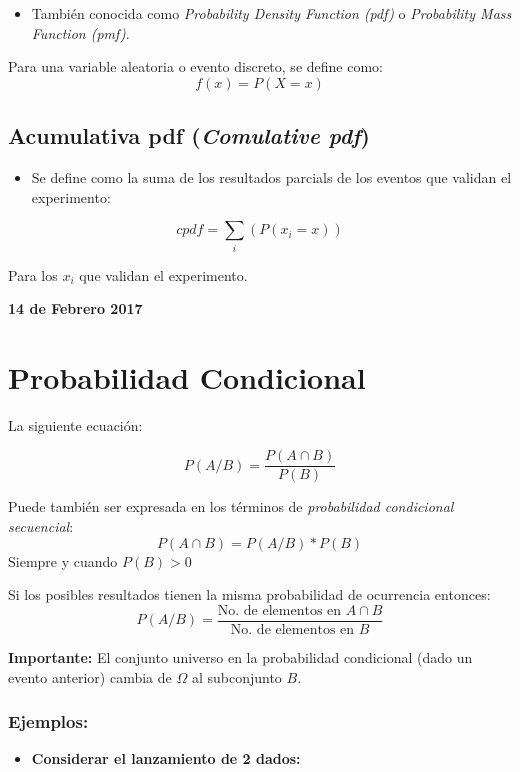 \documentclass[]{book}
\providecommand{\tightlist}{%
  \setlength{\itemsep}{0pt}\setlength{\parskip}{0pt}}
\begin{document}
\begin{itemize}
\tightlist
\item
  También conocida como \emph{Probability Density Function (pdf)} o
  \emph{Probability Mass Function (pmf)}.
\end{itemize}

Para una variable aleatoria o evento discreto, se define como:
\[f(x) = P(X=x)\]

\subsection{\texorpdfstring{Acumulativa pdf (\emph{Comulative
pdf})}{Acumulativa pdf (Comulative pdf)}}\label{acumulativa-pdf-comulative-pdf}

\begin{itemize}
\tightlist
\item
  Se define como la suma de los resultados parcials de los eventos que
  validan el experimento:
\end{itemize}

\[cpdf = \sum_{i}(P(x_i=x))\]

Para los \(x_i\) que validan el experimento.

\textbf{14 de Febrero 2017}

\section{Probabilidad Condicional}\label{probabilidad-condicional}

La siguiente ecuación:

\[P(A/B) = \frac{P(A\cap B)}{P(B)}\]

Puede también ser expresada en los términos de \emph{probabilidad
condicional secuencial}: \[P(A\cap B) = P(A/B)*P(B)\] Siempre y cuando
\(P(B)>0\)

Si los posibles resultados tienen la misma probabilidad de ocurrencia
entonces:
\[P(A/B) = \frac{\text{No. de elementos en } A\cap B}{\text{No. de elementos en }B}\]

\textbf{Importante:} El conjunto universo en la probabilidad condicional
(dado un evento anterior) cambia de \(\Omega\) al subconjunto \(B\).

\subsubsection{Ejemplos:}\label{ejemplos}

\begin{itemize}
\tightlist
\item
  \textbf{Considerar el lanzamiento de 2 dados:}
\end{itemize}
\end{document}
